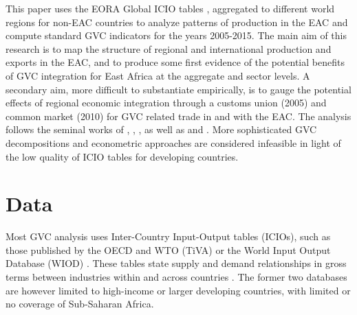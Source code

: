 \documentclass[a4paper]{article}
\begin{document}
This paper uses the EORA Global ICIO tables \citet{lenzen2012mapping, lenzen2013building}, aggregated to different world regions for non-EAC countries to analyze patterns of production in the EAC and compute standard GVC indicators for the years 2005-2015. The main aim of this research is to map the structure of regional and international production and exports in the EAC, and to produce some first evidence of the potential benefits of GVC integration for East Africa at the aggregate and sector levels. A secondary aim, more difficult to substantiate empirically, is to gauge the potential effects of regional economic integration through a customs union (2005) and common market (2010) for GVC related trade in and with the EAC.   %
The analysis follows the seminal works of \citet{hummels2001nature}, \citet{koopman2014tracing}, \citet{wang2013quantifying}, as well as \citet{Kummritz20161} and \citet{Kummritz20162}. More sophisticated GVC decompositions and econometric approaches are considered infeasible in light of the low quality of ICIO tables for developing countries. 

\section{Data}
Most GVC analysis uses Inter-Country Input-Output tables (ICIOs), such as those
published by the OECD and WTO (TiVA) or the World Input Output Database (WIOD)  \citep{timmer2012world}. These tables state supply and demand relationships in gross terms between industries within and across countries \citep{Kummritz2014}. The former two databases are however limited to high-income or larger developing countries, with limited or no coverage of Sub-Saharan Africa. \newline
\end{document}
